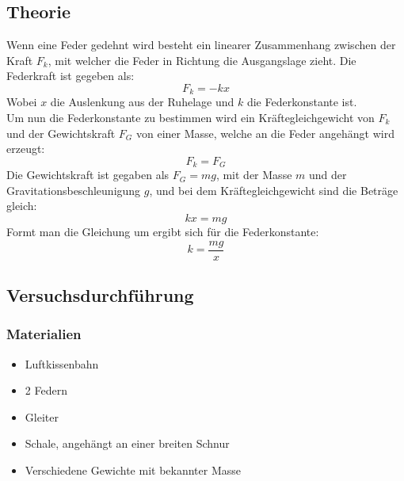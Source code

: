 \documentclass{article}
\begin{document}
      \subsection{Theorie}
          Wenn eine Feder gedehnt wird besteht ein linearer Zusammenhang zwischen der Kraft $F_k$, mit welcher die Feder in Richtung die Ausgangslage zieht. Die Federkraft ist gegeben als:
          \begin{equation}
              F_k = -kx
          \end{equation}
          Wobei $x$ die Auslenkung aus der Ruhelage und $k$ die Federkonstante  ist.\\
          Um nun die Federkonstante zu bestimmen wird ein Kräftegleichgewicht von $F_k$ und der Gewichtskraft $F_G$ von einer Masse, welche an die Feder angehängt wird erzeugt:
          \begin{equation}
              F_k = F_G
          \end{equation}
          Die Gewichtskraft ist gegaben als $F_G = mg$, mit der Masse $m$ und der Gravitationsbeschleunigung $g$, und bei dem Kräftegleichgewicht sind die Beträge gleich:
          \begin{equation}
              kx = mg
          \end{equation}
          Formt man die Gleichung um ergibt sich für die Federkonstante:
          \begin{equation}\label{eq:k}
              k = \frac{mg}{x}
          \end{equation}
      \subsection{Versuchsdurchführung}
          \subsubsection{Materialien}
              \begin{itemize}
                  \item Luftkissenbahn
                  \item 2 Federn
                  \item Gleiter
                  \item Schale, angehängt an einer breiten Schnur
                  \item Verschiedene Gewichte mit bekannter Masse
              \end{itemize}
\end{document}

